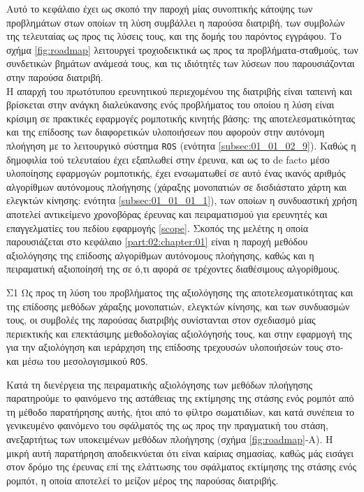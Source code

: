 Αυτό το κεφάλαιο έχει ως σκοπό την παροχή μίας συνοπτικής κάτοψης των
προβλημάτων στων οποίων τη λύση συμβάλλει η παρούσα διατριβή, των συμβολών της
τελευταίας ως προς τις λύσεις τους, και της δομής του παρόντος εγγράφου. Το
σχήμα \ref{fig:roadmap} λειτουργεί τροχιοδεικτικά ως προς τα
προβλήματα-σταθμούς, των συνδετικών βημάτων ανάμεσά τους, και τις ιδιότητές των
λύσεων που παρουσιάζονται στην παρούσα διατριβή.\\

Η απαρχή του πρωτότυπου ερευνητικού περιεχομένου της διατριβής είναι ταπεινή
και βρίσκεται στην ανάγκη διαλεύκανσης ενός προβλήματος του οποίου η λύση είναι
κρίσιμη σε πρακτικές εφαρμογές ρομποτικής κινητής βάσης: της
αποτελεσματικότητας και της επίδοσης των διαφορετικών υλοποιήσεων που αφορούν
στην αυτόνομη πλοήγηση με το λειτουργικό σύστημα \texttt{ROS} (ενότητα
\ref{subsec:01_01_02_9}). Καθώς η δημοφιλία τού τελευταίου έχει εξαπλωθεί στην
έρευνα, και ως το de facto μέσο υλοποίησης εφαρμογών ρομποτικής, έχει
ενσωματωθεί σε αυτό ένας ικανός αριθμός αλγορίθμων αυτόνομους πλοήγησης
(χάραξης μονοπατιών σε δισδιάστατο χάρτη και ελεγκτών κίνησης: ενότητα
\ref{subsec:01_01_01_1}), των οποίων η συνδυαστική χρήση αποτελεί αντικείμενο
χρονοβόρας έρευνας και πειραματισμού για ερευνητές και επαγγελματίες του πεδίου
εφαρμογής \ref{scope}. Σκοπός της μελέτης η οποία παρουσιάζεται στο κεφάλαιο
\ref{part:02:chapter:01} είναι η παροχή μεθόδου αξιολόγησης της επίδοσης
αλγορίθμων αυτόνομους πλοήγησης, καθώς και η πειραματική αξιοποίησή της σε ό,τι
αφορά σε τρέχοντες διαθέσιμους αλγορίθμους.

\begin{bw_box}
\begin{customcontribution}{Σ1}
  \label{contribution:01}
  Ως προς τη λύση του προβλήματος της αξιολόγησης της αποτελεσματικότητας και
  της επίδοσης μεθόδων χάραξης μονοπατιών, ελεγκτών κίνησης, και των συνδυασμών
  τους, οι συμβολές της παρούσας διατριβής συνίστανται στον σχεδιασμό μίας
  περιεκτικής και επεκτάσιμης μεθοδολογίας αξιολόγησής τους, και στην εφαρμογή
  της για την αξιολόγηση και ιεράρχηση της επίδοσης τρεχουσών υλοποιήσεών τους
  στο- και μέσω του μεσολογισμικού \texttt{ROS}. \cite{Filotheou2020b}
\end{customcontribution}
\end{bw_box}

Κατά τη διενέργεια της πειραματικής αξιολόγησης των μεθόδων πλοήγησης
παρατηρούμε το φαινόμενο της αστάθειας της εκτίμησης της στάσης ενός ρομπότ από
τη μέθοδο παρατήρησης αυτής, ήτοι από το φίλτρο σωματιδίων, και κατά συνέπεια
το γενικευμένο φαινόμενο του σφάλματός της ως προς την πραγματική του στάση,
ανεξαρτήτως των υποκειμένων μεθόδων πλοήγησης (σχήμα \ref{fig:roadmap}-Α). Η
μικρή αυτή παρατήρηση αποδεικνύεται ότι είναι καίριας σημασίας, καθώς μάς
εισάγει στον δρόμο της έρευνας επί της ελάττωσης του σφάλματος εκτίμησης της
στάσης ενός ρομπότ, η οποία αποτελεί το μείζον μέρος της παρούσας διατριβής.\\

